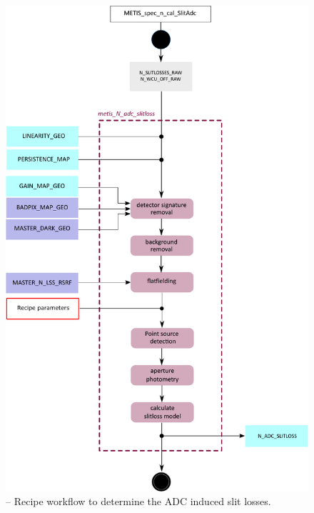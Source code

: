 \begin{figure}[ht]
  \centering
  \includegraphics[width=0.5\textheight]{figures/metis_n_lss_adc_slitloss_v0.83.pdf}
  \caption[Recipe: ]{ --
    Recipe workflow to determine the \ac{ADC} induced slit losses.}
  \label{Fig:rec_n_adc_slitloss}
\end{figure}


